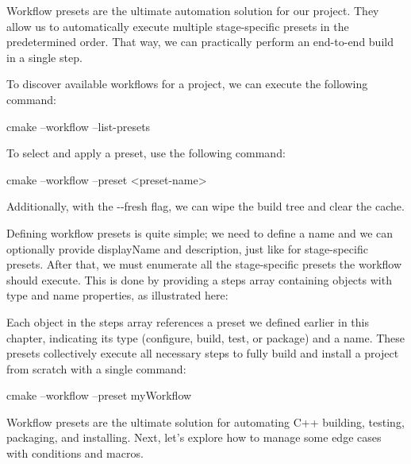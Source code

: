 Workflow presets are the ultimate automation solution for our project. They allow us to automatically execute multiple stage-specific presets in the predetermined order. That way, we can practically perform an end-to-end build in a single step.

To discover available workflows for a project, we can execute the following command:

\begin{shell}
cmake --workflow --list-presets
\end{shell}

To select and apply a preset, use the following command:

\begin{shell}
cmake –workflow --preset <preset-name>
\end{shell}

Additionally, with the -{}-fresh flag, we can wipe the build tree and clear the cache.

Defining workflow presets is quite simple; we need to define a name and we can optionally provide displayName and description, just like for stage-specific presets. After that, we must enumerate all the stage-specific presets the workflow should execute. This is done by providing a steps array containing objects with type and name properties, as illustrated here:


\begin{json}
...
"workflowPresets": [
{
    "name": "myWorkflow",
    "steps": [
        {
            "type": "configure",
            "name": "myConfigure"
        },
        {
            "type": "build",
            "name": "myBuild"
        },
        {
            "type": "test",
            "name": "myTest"
        },
        {
            "type": "package",
            "name": "myPackage"
        },
        {
            "type": "build",
            "name": "myInstall"
        }
    ]
...
\end{json}

Each object in the steps array references a preset we defined earlier in this chapter, indicating its type (configure, build, test, or package) and a name. These presets collectively execute all necessary steps to fully build and install a project from scratch with a single command:

\begin{shell}
cmake --workflow --preset myWorkflow
\end{shell}

Workflow presets are the ultimate solution for automating C++ building, testing, packaging, and installing. Next, let’s explore how to manage some edge cases with conditions and macros.




